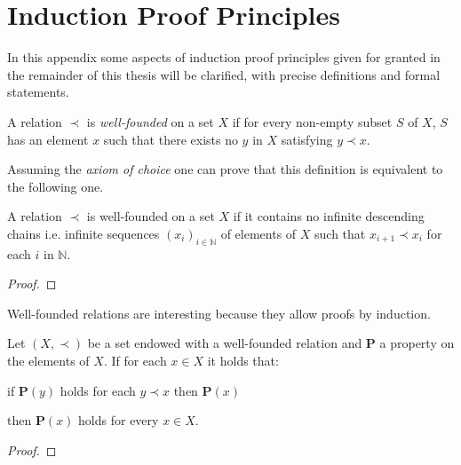 \chapter{Induction Proof Principles}
In this appendix some aspects of induction proof principles given for granted in the remainder of this thesis will be clarified, with precise definitions and formal statements.
\begin{definition}
	A relation $\prec$ is \emph{well-founded} on a set $X$ if for every non-empty subset $S$ of $X$, $S$ has an element $x$ such that there exists no $y$ in $X$ satisfying $y\prec x$.
\end{definition}
Assuming the \emph{axiom of choice} one can prove that this definition is equivalent to the following one.
\begin{definition}
	A relation $\prec$ is well-founded on a set $X$ if it contains no infinite descending chains i.e. infinite sequences $(x_i)_{i\in\mathbb{N}}$ of elements of $X$ such that $x_{i+1}\prec x_i$ for each $i$ in $\mathbb{N}$.
\end{definition}
\begin{proof}
\end{proof}
Well-founded relations are interesting because they allow proofs by induction.
\begin{proposition}
	Let $(X,\prec)$ be a set endowed with a well-founded relation and $\mathbf{P}$ a property on the elements of $X$. If for each $x\in X$ it holds that: 
	\begin{center} if $\mathbf{P}(y)$ holds  for each $y\prec x$ then $\mathbf{P}(x)$\end{center}
	then $\mathbf{P}(x)$ holds for every $x\in X$.
\end{proposition}
\begin{proof}
\end{proof}

